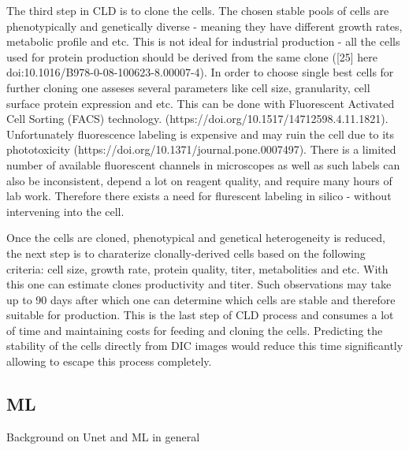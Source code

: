 The third step in CLD is to clone the cells. The chosen stable pools of cells are phenotypically and genetically diverse - meaning they have different growth rates, metabolic profile and etc. This is not ideal for industrial production - all the cells used for protein production should be derived from the same clone ([25] here doi:10.1016/B978-0-08-100623-8.00007-4). In order to choose single best cells for further cloning one asseses several parameters like cell size, granularity, cell surface protein expression and etc. This can be done with Fluorescent Activated Cell Sorting (FACS) technology. (https://doi.org/10.1517/14712598.4.11.1821). Unfortunately fluorescence labeling is expensive and may ruin the cell due to its phototoxicity (https://doi.org/10.1371/journal.pone.0007497). There is a limited number of available fluorescent channels in microscopes as well as such labels can also be inconsistent, depend a lot on reagent quality, and require many hours of lab work. Therefore there exists a need for flurescent labeling in silico - without intervening into the cell. 

Once the cells are cloned, phenotypical and genetical heterogeneity is reduced, the next step is to charaterize clonally-derived cells based on the following criteria: cell size, growth rate, protein quality, titer, metabolities and etc. With this one can estimate clones productivity and titer. Such observations may take up to 90 days after which one can determine which cells are stable and therefore suitable for production. This is the last step of CLD process and consumes a lot of time and maintaining costs for feeding and cloning the cells. Predicting the stability of the cells directly from DIC images would reduce this time significantly allowing to escape this process completely.

\subsection{ML}
Background on Unet and ML in general
